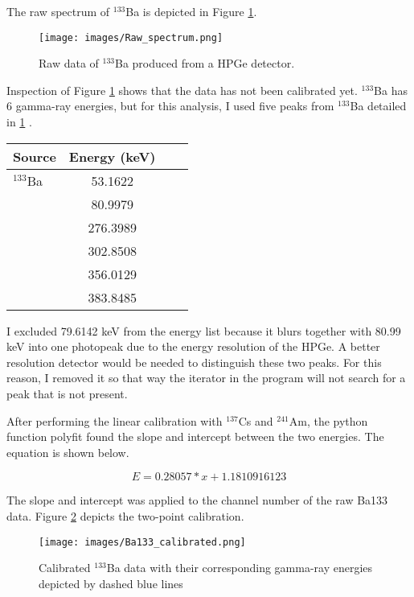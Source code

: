 The raw spectrum of $^{133}$Ba is depicted in Figure \ref{fig:raw_data}.

\begin{figure}[H]
\centering
\texttt{[image: images/Raw\_spectrum.png]}
\caption{Raw data of $^{133}$Ba produced from a HPGe detector.}
\label{fig:raw_data}
\end{figure}

Inspection of Figure \ref{fig:raw_data} shows that the data has not been calibrated yet.
$^{133}$Ba has 6 gamma-ray energies, but for this analysis, I used five peaks from $^{133}$Ba
detailed in \ref{table:energy} \cite{Untitled27:online}.

\begin{table}[H]
\begin{center}
\begin{tabular}{l|c|c|r}
\textbf{Source} & \textbf{Energy (keV)}\\
\hline
$^{133}$Ba    &  53.1622 \\
              &  80.9979 \\
              &  276.3989 \\
              & 302.8508  \\
              & 356.0129 \\
              & 383.8485 \\
\end{tabular}
\end{center}
\label{table:energy}
\end{table}

I excluded 79.6142 keV from the energy list because it blurs together with
80.99 keV into one photopeak due to the energy resolution
of the HPGe. A better resolution detector would be needed to distinguish
these two peaks. For this reason, I removed it so that way the iterator in the program will
not search for a peak that is not present.

After performing the linear calibration with $^{137}$Cs and $^{241}$Am,
the python function polyfit found the slope and intercept between
the two energies. The equation is shown below.

\begin{equation}
E = 0.28057*x + 1.1810916123
\end{equation}

The slope and intercept was applied to the channel number of the raw Ba133 data.
Figure \ref{fig:CE} depicts the two-point calibration.

\begin{figure}[H]
\centering
\texttt{[image: images/Ba133\_calibrated.png]}
\caption{Calibrated $^{133}$Ba data with their corresponding gamma-ray energies
depicted by dashed blue lines}
\label{fig:CE}
\end{figure}
